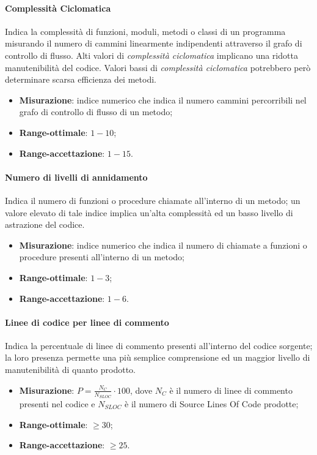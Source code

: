 \paragraph{Complessità Ciclomatica}
Indica la complessità di funzioni, moduli, metodi o classi di un programma misurando il numero di cammini linearmente indipendenti attraverso il grafo di controllo di flusso.
Alti valori di  \textit{complessità ciclomatica} implicano una ridotta manutenibilità del codice. Valori bassi di  \textit{complessità ciclomatica} potrebbero però determinare scarsa efficienza dei metodi.
\begin{itemize}
\item \textbf{Misurazione}: indice numerico che indica il numero cammini percorribili nel grafo di controllo di flusso di un metodo;
\item \textbf{Range-ottimale}: $1 - 10$;
\item \textbf{Range-accettazione}: $1 - 15$.
\end{itemize}
\paragraph{Numero di livelli di annidamento}
Indica il numero di funzioni o procedure chiamate all'interno di un metodo; un valore elevato di tale indice implica un'alta complessità ed un basso livello di astrazione del codice.
\begin{itemize}
\item \textbf{Misurazione}: indice numerico che indica il numero di chiamate a funzioni o procedure presenti all'interno di un metodo;
\item \textbf{Range-ottimale}: $1 - 3$;
\item \textbf{Range-accettazione}: $1 - 6$.
\end{itemize}
\paragraph{Linee di codice per linee di commento}
Indica la percentuale di linee di commento presenti all'interno del codice sorgente; la loro presenza permette una più semplice comprensione ed un maggior livello di manutenibilità di quanto prodotto.
\begin{itemize}
\item \textbf{Misurazione}: $P=\frac{N_{C}}{N_{SLOC}} \cdot 100$, dove $N_{C}$ è il numero di linee di commento presenti nel codice e $N_{SLOC}$ è il numero di Source Lines Of Code prodotte;
\item \textbf{Range-ottimale}: $\geq 30$;
\item \textbf{Range-accettazione}: $\geq 25$.
\end{itemize}
